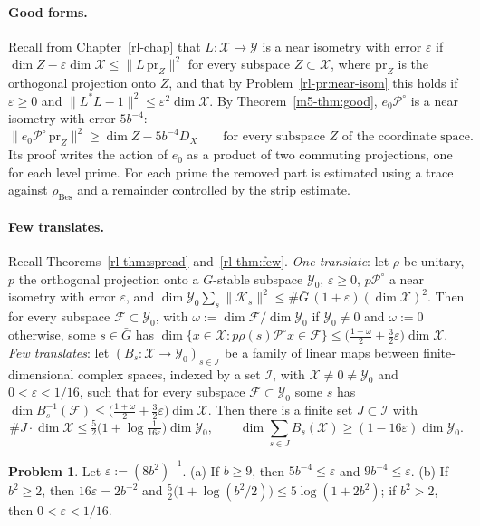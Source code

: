 \documentclass[reqno]{amsart}
\newcounter{chap}
\theoremstyle{definition}
\newtheorem{problem}{Problem}[section]
\theoremstyle{plain}
\theoremstyle{remark}
\newcommand{\Xc}{\mathcal X}
\newcommand{\Yc}{\mathcal Y}
\newcommand{\Kc}{\mathcal K}
\newcommand{\Pc}{\mathcal P}
\newcommand{\Gb}{\bar G}
\newcommand{\rB}{\rho_{\mathrm{Bes}}}
\begin{document}
\paragraph{Good forms.}  Recall from Chapter~\ref{rl-chap} that \(L\colon\Xc\to\Yc\) is a near isometry with error \(\varepsilon\) if \(\dim Z-\varepsilon\dim\Xc\le\lVert L\,\mathrm{pr}_Z\rVert^2\) for every subspace \(Z\subset\Xc\), where \(\mathrm{pr}_Z\) is the orthogonal projection onto \(Z\), and that by Problem~\ref{rl-pr:near-isom} this holds if \(\varepsilon\ge0\) and \(\lVert L^*L-1\rVert^2\le\varepsilon^2\dim\Xc\).  By Theorem~\ref{m5-thm:good}, \(e_0\Pc^\circ\) is a near isometry with error \(5b^{-4}\):
\[
 \lVert e_0\Pc^\circ\,\mathrm{pr}_Z\rVert^2\ge\dim Z-5b^{-4}D_X\qquad\text{for every subspace \(Z\) of the coordinate space.}
\]
Its proof writes the action of \(e_0\) as a product of two commuting projections, one for each level prime.  For each prime the removed part is estimated using a trace against \(\rB\) and a remainder controlled by the strip estimate.

\paragraph{Few translates.}  Recall Theorems~\ref{rl-thm:spread} and~\ref{rl-thm:few}.  \emph{One translate}: let \(\rho\) be unitary, \(p\) the orthogonal projection onto a \(\Gb\)-stable subspace \(\Yc_0\), \(\varepsilon\ge0\), \(p\Pc^\circ\) a near isometry with error \(\varepsilon\), and \(\dim\Yc_0\sum_s\lVert\Kc_s\rVert^2\le\#\Gb\,(1+\varepsilon)(\dim\Xc)^2\).  Then for every subspace \(\mathcal F\subset\Yc_0\), with \(\omega:=\dim\mathcal F/\dim\Yc_0\) if \(\Yc_0\ne0\) and \(\omega:=0\) otherwise, some \(s\in\Gb\) has \(\dim\{x\in\Xc:p\rho(s)\Pc^\circ x\in\mathcal F\}\le\bigl(\frac{1+\omega}2+\frac32\varepsilon\bigr)\dim\Xc\).  \emph{Few translates}: let \((B_s\colon\Xc\to\Yc_0)_{s\in\mathcal I}\) be a family of linear maps between finite-dimensional complex spaces, indexed by a set \(\mathcal I\), with \(\Xc\ne0\ne\Yc_0\) and \(0<\varepsilon<1/16\), such that for every subspace \(\mathcal F\subset\Yc_0\) some \(s\) has \(\dim B_s^{-1}(\mathcal F)\le\bigl(\frac{1+\omega}2+\frac32\varepsilon\bigr)\dim\Xc\).  Then there is a finite set \(J\subset\mathcal I\) with
\[
 \#J\cdot\dim\Xc\le\tfrac52\bigl(1+\log\tfrac1{16\varepsilon}\bigr)\dim\Yc_0,\qquad
 \dim\sum_{s\in J}B_s(\Xc)\ge(1-16\varepsilon)\dim\Yc_0 .
\]

\begin{problem}\label{pr:constants}
Let \(\varepsilon:=(8b^2)^{-1}\).  (a) If \(b\ge9\), then \(5b^{-4}\le\varepsilon\) and \(9b^{-4}\le\varepsilon\).  (b) If \(b^2\ge2\), then \(16\varepsilon=2b^{-2}\) and \(\frac52\bigl(1+\log(b^2/2)\bigr)\le5\log(1+2b^2)\); if \(b^2>2\), then \(0<\varepsilon<1/16\).
\end{problem}
\end{document}
